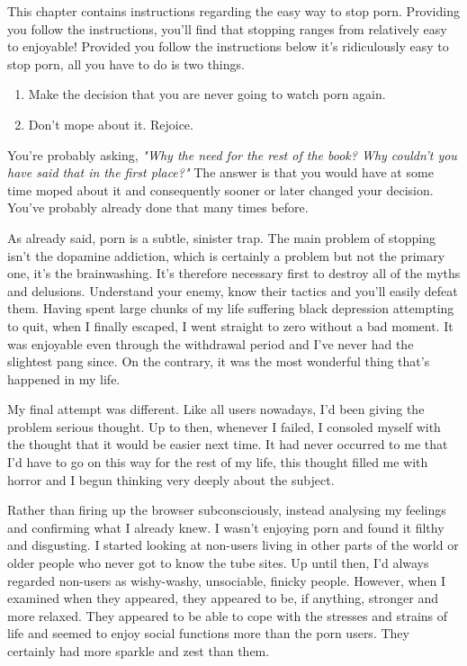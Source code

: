 \documentclass[easypeasy]{subfiles}
\begin{document}
This chapter contains instructions regarding the easy way to stop porn. Providing you follow the instructions, you'll find that stopping ranges from relatively easy to enjoyable! Provided you follow the instructions below it's ridiculously easy to stop porn, all you have to do is two things.

\begin{enumerate}
  \item Make the decision that you are never going to watch porn again.
  \item Don't mope about it. Rejoice.
\end{enumerate}

You're probably asking, \textit{"Why the need for the rest of the book? Why couldn't you have said that in the first place?"} The answer is that you would have at some time moped about it and consequently sooner or later changed your decision. You've probably already done that many times before.

As already said, porn is a subtle, sinister trap. The main problem of stopping isn't the dopamine addiction, which is certainly a problem but not the primary one, it's the brainwashing. It's therefore necessary first to destroy all of the myths and delusions. Understand your enemy, know their tactics and you'll easily defeat them. Having spent large chunks of my life suffering black depression attempting to quit, when I finally escaped, I went straight to zero without a bad moment. It was enjoyable even through the withdrawal period and I've never had the slightest pang since. On the contrary, it was the most wonderful thing that's happened in my life.

My final attempt was different. Like all users nowadays, I'd been giving the problem serious thought. Up to then, whenever I failed, I consoled myself with the thought that it would be easier next time. It had never occurred to me that I'd have to go on this way for the rest of my life, this thought filled me with horror and I begun thinking very deeply about the subject.

Rather than firing up the browser subconsciously, instead analysing my feelings and confirming what I already knew. I wasn't enjoying porn and found it filthy and disgusting. I started looking at non-users living in other parts of the world or older people who never got to know the tube sites. Up until then, I'd always regarded non-users as wishy-washy, unsociable, finicky people. However, when I examined when they appeared, they appeared to be, if anything, stronger and more relaxed. They appeared to be able to cope with the stresses and strains of life and seemed to enjoy social functions more than the porn users. They certainly had more sparkle and zest than them.
\end{document}
